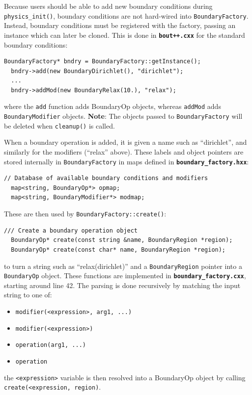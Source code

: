 \documentclass[12pt]{article}
\newcommand{\code}[1]{\texttt{#1}}
\newcommand{\file}[1]{\texttt{\bf #1}}
\begin{document}
Because users should be able to add new boundary conditions during
\code{physics\_init()}, boundary conditions are not hard-wired into
\code{BoundaryFactory}. Instead, boundary conditions must be registered
with the factory, passing an instance which can later be cloned. This
is done in \file{bout++.cxx} for the standard boundary conditions:
\begin{lstlisting}[firstnumber=258]
  BoundaryFactory* bndry = BoundaryFactory::getInstance();
  bndry->add(new BoundaryDirichlet(), "dirichlet");
  ...
  bndry->addMod(new BoundaryRelax(10.), "relax");
\end{lstlisting}
where the \code{add} function adds BoundaryOp objects, whereas
\code{addMod} adds \code{BoundaryModifier} objects. {\bf Note}: The
objects passed to \code{BoundaryFactory} will be deleted when \code{cleanup()}
is called.

When a boundary operation is added, it is given a name
such as ``dirichlet'', and similarly for the modifiers (``relax'' above).
These labels and object pointers are stored internally in \code{BoundaryFactory}
in maps defined in \file{boundary\_factory.hxx}:
\begin{lstlisting}[firstnumber=43]
  // Database of available boundary conditions and modifiers
  map<string, BoundaryOp*> opmap;
  map<string, BoundaryModifier*> modmap;
\end{lstlisting}
These are then used by \code{BoundaryFactory::create()}:
\begin{lstlisting}[firstnumber=24]
  /// Create a boundary operation object
  BoundaryOp* create(const string &name, BoundaryRegion *region);
  BoundaryOp* create(const char* name, BoundaryRegion *region);
\end{lstlisting}
to turn a string such as ``relax(dirichlet)'' and a \code{BoundaryRegion}
pointer into a \code{BoundaryOp} object. These functions are implemented
in \file{boundary\_factory.cxx}, starting around line 42. The parsing is
done recursively by matching the input string to one of:
\begin{itemize}
\item \code{modifier(<expression>, arg1, ...)}
\item \code{modifier(<expression>)}
\item \code{operation(arg1, ...)}
\item \code{operation}
\end{itemize}
the \code{<expression>} variable is then resolved into a BoundaryOp
object by calling \code{create(<expression, region)}.
\end{document}
